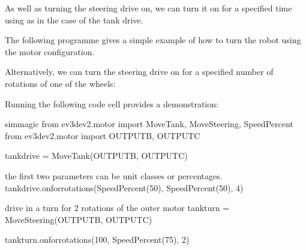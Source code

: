 \documentclass[letterpaper,10pt,english]{sphinxmanual}
\begin{document}
As well as turning the steering drive on, we can turn it on for a specified time using  as in the case of the tank drive.

The following programme gives a simple example of how to turn the robot using the  motor configuration.



Alternatively, we can turn the steering drive on for a specified number of rotations of one of the wheels:

\begin{sphinxVerbatim}[commandchars=\\\{\}]
  
\end{sphinxVerbatim}

Running the following code cell provides a demonstration:

{
\begin{sphinxVerbatim}[commandchars=\\\{\}]
\llap{\color{nbsphinxin}[ ]:\,\hspace{\fboxrule}\hspace{\fboxsep}}\PYGZpc{}\PYGZpc{}sim\PYGZus{}magic
from ev3dev2.motor import MoveTank, MoveSteering, SpeedPercent
from ev3dev2.motor import OUTPUT\PYGZus{}B, OUTPUT\PYGZus{}C

tank\PYGZus{}drive = MoveTank(OUTPUT\PYGZus{}B, OUTPUT\PYGZus{}C)

\PYGZsh{} the first two parameters can be unit classes or percentages.
tank\PYGZus{}drive.on\PYGZus{}for\PYGZus{}rotations(SpeedPercent(50), SpeedPercent(50), 4)

\PYGZsh{} drive in a turn for 2 rotations of the outer motor
tank\PYGZus{}turn = MoveSteering(OUTPUT\PYGZus{}B, OUTPUT\PYGZus{}C)

tank\PYGZus{}turn.on\PYGZus{}for\PYGZus{}rotations(\PYGZhy{}100, SpeedPercent(75), 2)
\end{sphinxVerbatim}
}
\end{document}
